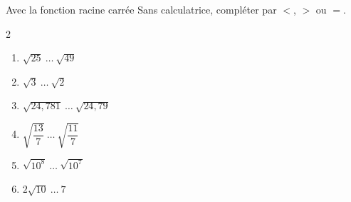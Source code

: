 \begin{exo}{Avec la fonction racine carrée}
	Sans calculatrice, compléter par $<$, $>$ ou $=$.
	\vspace*{-2mm}
	\begin{multicols}{2}
	\begin{enumerate}[itemsep=2mm]
		\item $\sqrt{25} \ \dots \ \sqrt{49}$
		\item $\sqrt{3} \ \dots \ \sqrt{2}$
		\item $\sqrt{24,781} \ \dots \ \sqrt{24,79}$
		\item $\sqrt{\dfrac{13}{7}} \ \dots \ \sqrt{\dfrac{11}{7}}$
		\item $\sqrt{10^8} \ \dots \ \sqrt{10^7}$
		\item $2\sqrt{10} \ \dots \ 7$
	\end{enumerate}
	\end{multicols}\vspace*{-2mm}
\end{exo}
